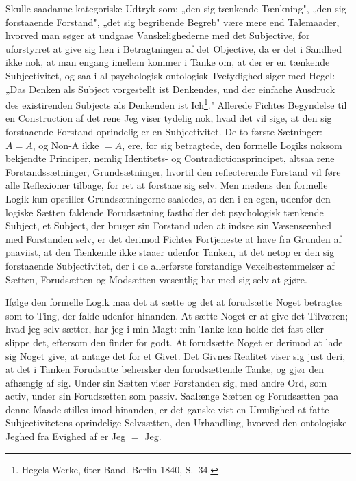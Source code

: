 \documentclass[12pt]{book}
\newcommand{\opage}[1]{\marginnote{\footnotesize\textit{[#1]}}}
\begin{document}
Skulle saadanne kategoriske Udtryk som: „den sig tænkende Tænkning", „den sig
forstaaende Forstand", „det sig begribende Begreb" være mere end Talemaader,
hvorved man søger at undgaae Vanskelighederne med det Subjective, for uforstyrret
at give sig hen i Betragtningen af det Objective, da er det i Sandhed ikke nok, at
man engang imellem kommer i Tanke om, at der er en tænkende Subjectivitet, og
\opage{64} saa i al psychologisk-ontologisk Tvetydighed siger med Hegel: „Das Denken als
Subject vorgestellt ist Denkendes, und der einfache Ausdruck des existirenden
Subjects als Denkenden ist Ich\footnote{Hegels Werke, 6ter Band. Berlin 1840,
S.~34.}." Allerede Fichtes Begyndelse til en Construction af det rene Jeg viser
tydelig nok, hvad det vil sige, at den sig forstaaende Forstand oprindelig er en
Subjectivitet. De to første Sætninger: $A = A$, og Non-A ikke $= A$, ere, for sig
betragtede, den formelle Logiks noksom bekjendte Principer, nemlig Identitets- og
Contradictionsprincipet, altsaa rene Forstandssætninger, Grundsætninger, hvortil
den reflecterende Forstand vil føre alle Reflexioner tilbage, for ret at forstaae
sig selv. Men medens den formelle Logik kun opstiller Grundsætningerne saaledes, at
den i en egen, udenfor den logiske Sætten faldende Forudsætning fastholder det
psychologisk tænkende Subject, et Subject, der bruger sin Forstand uden at indsee
sin Væsenseenhed med Forstanden selv, er det derimod Fichtes Fortjeneste at have
fra Grunden af paaviist, at den Tænkende ikke staaer udenfor Tanken, at det netop
er den sig forstaaende Subjectivitet, der i de allerførste forstandige
Vexelbestemmelser af Sætten, Forudsætten og Modsætten væsentlig har med sig selv at
gjøre.

Ifølge den formelle Logik maa det at sætte og det at forudsætte Noget betragtes som
to Ting, der falde udenfor hinanden. At sætte Noget er at give det Tilværen; hvad
jeg selv sætter, har jeg i min Magt: min Tanke kan holde det fast eller slippe det,
eftersom den finder for godt. At forudsætte Noget er derimod at lade sig Noget
give, at antage det for et Givet. Det Givnes Realitet viser sig just deri, at det i
Tanken Forudsatte behersker den forudsættende Tanke, og gjør den afhængig af sig.
Under sin Sætten viser Forstanden sig, med andre Ord, som activ, under sin
Forudsætten som passiv. Saalænge Sætten og Forudsætten paa denne
\opage{65} Maade stilles imod hinanden, er det ganske vist en Umulighed at fatte
Subjectivitetens oprindelige Selvsætten, den Urhandling, hvorved den ontologiske
Jeghed fra Evighed af er Jeg $=$ Jeg.
\end{document}

